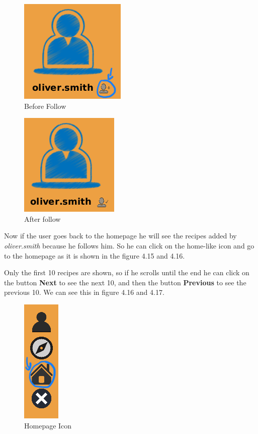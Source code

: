 \documentclass[a4paper]{report}
\begin{document}
\begin{figure}[htpb]
	\centering
	\includegraphics[scale=0.6]{img/user_manual/howToFollow.png}
	\caption{Before Follow}
\end{figure}

\begin{figure}[htpb]
	\centering
	\includegraphics[scale=0.6]{img/user_manual/afterfollow.png}
	\caption{After follow}
\end{figure}

\newpage
\noindent Now if the user goes back to the homepage he will see the recipes added by \emph{oliver.smith} because he follows him. So he can click on the home-like icon and go to the homepage as it is shown in the figure 4.15 and 4.16.

\noindent Only the first 10 recipes are shown, so if he scrolls until the end he can click on the button \textbf{Next} to see the next 10, and then the button \textbf{Previous} to see the previous 10. We can see this in figure 4.16 and 4.17.

\begin{figure}[htpb]
	\centering
	\includegraphics[scale=0.6]{img/user_manual/menu.png}
	\caption{Homepage Icon}
\end{figure}
\end{document}
